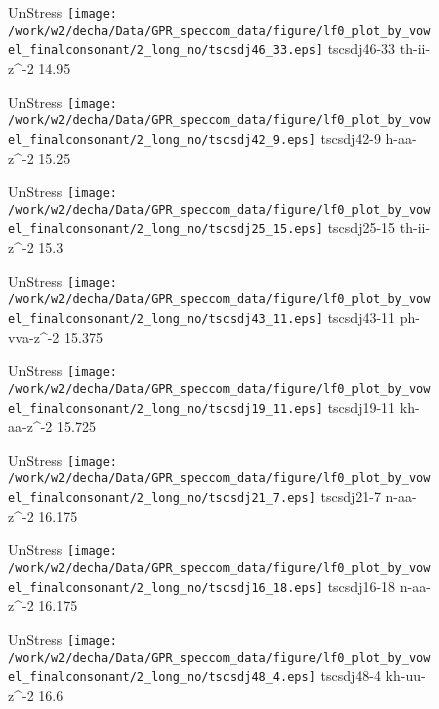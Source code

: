 \documentclass{article}
\begin{document}
\begin{figure}[t]
\begin{minipage}[b]{.24\textwidth}
UnStress
\centering
\texttt{[image: /work/w2/decha/Data/GPR\_speccom\_data/figure/lf0\_plot\_by\_vowel\_finalconsonant/2\_long\_no/tscsdj46\_33.eps]}
tscsdj46-33 th-ii-z\textasciicircum-2 14.95
\end{minipage}
\begin{minipage}[b]{.24\textwidth}
UnStress
\centering
\texttt{[image: /work/w2/decha/Data/GPR\_speccom\_data/figure/lf0\_plot\_by\_vowel\_finalconsonant/2\_long\_no/tscsdj42\_9.eps]}
tscsdj42-9 h-aa-z\textasciicircum-2 15.25
\end{minipage}
\begin{minipage}[b]{.24\textwidth}
UnStress
\centering
\texttt{[image: /work/w2/decha/Data/GPR\_speccom\_data/figure/lf0\_plot\_by\_vowel\_finalconsonant/2\_long\_no/tscsdj25\_15.eps]}
tscsdj25-15 th-ii-z\textasciicircum-2 15.3
\end{minipage}
\begin{minipage}[b]{.24\textwidth}
UnStress
\centering
\texttt{[image: /work/w2/decha/Data/GPR\_speccom\_data/figure/lf0\_plot\_by\_vowel\_finalconsonant/2\_long\_no/tscsdj43\_11.eps]}
tscsdj43-11 ph-vva-z\textasciicircum-2 15.375
\end{minipage}
\end{figure}

\begin{figure}[t]
\begin{minipage}[b]{.24\textwidth}
UnStress
\centering
\texttt{[image: /work/w2/decha/Data/GPR\_speccom\_data/figure/lf0\_plot\_by\_vowel\_finalconsonant/2\_long\_no/tscsdj19\_11.eps]}
tscsdj19-11 kh-aa-z\textasciicircum-2 15.725
\end{minipage}
\begin{minipage}[b]{.24\textwidth}
UnStress
\centering
\texttt{[image: /work/w2/decha/Data/GPR\_speccom\_data/figure/lf0\_plot\_by\_vowel\_finalconsonant/2\_long\_no/tscsdj21\_7.eps]}
tscsdj21-7 n-aa-z\textasciicircum-2 16.175
\end{minipage}
\begin{minipage}[b]{.24\textwidth}
UnStress
\centering
\texttt{[image: /work/w2/decha/Data/GPR\_speccom\_data/figure/lf0\_plot\_by\_vowel\_finalconsonant/2\_long\_no/tscsdj16\_18.eps]}
tscsdj16-18 n-aa-z\textasciicircum-2 16.175
\end{minipage}
\begin{minipage}[b]{.24\textwidth}
UnStress
\centering
\texttt{[image: /work/w2/decha/Data/GPR\_speccom\_data/figure/lf0\_plot\_by\_vowel\_finalconsonant/2\_long\_no/tscsdj48\_4.eps]}
tscsdj48-4 kh-uu-z\textasciicircum-2 16.6
\end{minipage}
\end{figure}
\end{document}
